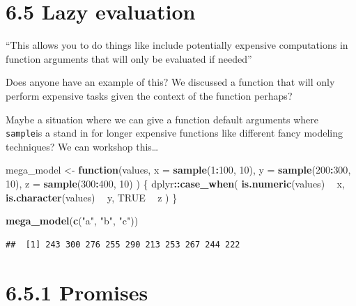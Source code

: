 \documentclass[]{book}
\newenvironment{Shaded}{\begin{snugshade}}{\end{snugshade}}
\newcommand{\ControlFlowTok}[1]{\textcolor[rgb]{0.13,0.29,0.53}{\textbf{#1}}}
\newcommand{\DataTypeTok}[1]{\textcolor[rgb]{0.13,0.29,0.53}{#1}}
\newcommand{\DecValTok}[1]{\textcolor[rgb]{0.00,0.00,0.81}{#1}}
\newcommand{\KeywordTok}[1]{\textcolor[rgb]{0.13,0.29,0.53}{\textbf{#1}}}
\newcommand{\NormalTok}[1]{#1}
\newcommand{\OperatorTok}[1]{\textcolor[rgb]{0.81,0.36,0.00}{\textbf{#1}}}
\newcommand{\OtherTok}[1]{\textcolor[rgb]{0.56,0.35,0.01}{#1}}
\newcommand{\StringTok}[1]{\textcolor[rgb]{0.31,0.60,0.02}{#1}}
\begin{document}
\hypertarget{lazy-evaluation}{%
\section*{6.5 Lazy evaluation}\label{lazy-evaluation}}

``This allows you to do things like include potentially expensive computations in function arguments that will only be evaluated if needed''

Does anyone have an example of this? We discussed a function that will only perform expensive tasks given the context of the function perhaps?

Maybe a situation where we can give a function default arguments where \texttt{sample}is a stand in for longer expensive functions like different fancy modeling techniques? We can workshop this\ldots{}

\begin{Shaded}
\begin{Highlighting}[]
\NormalTok{mega_model <-}\StringTok{ }\ControlFlowTok{function}\NormalTok{(values, }\DataTypeTok{x =} \KeywordTok{sample}\NormalTok{(}\DecValTok{1}\OperatorTok{:}\DecValTok{100}\NormalTok{, }\DecValTok{10}\NormalTok{), }\DataTypeTok{y =} \KeywordTok{sample}\NormalTok{(}\DecValTok{200}\OperatorTok{:}\DecValTok{300}\NormalTok{, }\DecValTok{10}\NormalTok{), }\DataTypeTok{z =} \KeywordTok{sample}\NormalTok{(}\DecValTok{300}\OperatorTok{:}\DecValTok{400}\NormalTok{, }\DecValTok{10}\NormalTok{)}
\NormalTok{) \{}
\NormalTok{  dplyr}\OperatorTok{::}\KeywordTok{case_when}\NormalTok{(}
    \KeywordTok{is.numeric}\NormalTok{(values) }\OperatorTok{~}\StringTok{ }\NormalTok{x,}
    \KeywordTok{is.character}\NormalTok{(values) }\OperatorTok{~}\StringTok{ }\NormalTok{y,}
    \OtherTok{TRUE} \OperatorTok{~}\StringTok{ }\NormalTok{z}
\NormalTok{  )}
\NormalTok{\}}

\KeywordTok{mega_model}\NormalTok{(}\KeywordTok{c}\NormalTok{(}\StringTok{"a"}\NormalTok{, }\StringTok{"b"}\NormalTok{, }\StringTok{"c"}\NormalTok{))}
\end{Highlighting}
\end{Shaded}

\begin{verbatim}
##  [1] 243 300 276 255 290 213 253 267 244 222
\end{verbatim}

\hypertarget{promises}{%
\section*{6.5.1 Promises}\label{promises}}
\end{document}
